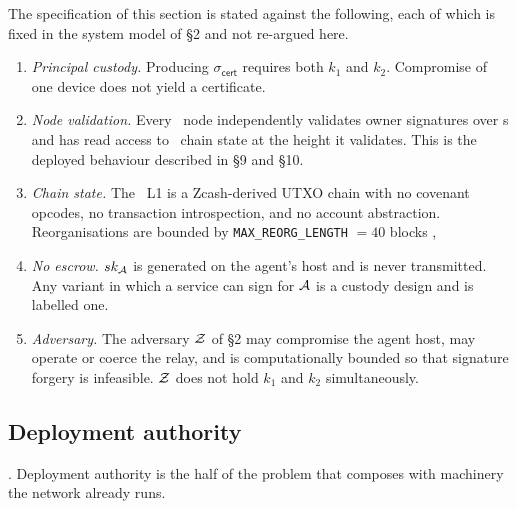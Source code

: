 \begin{assumption}
\label{ass:agent}
The specification of this section is stated against the following, each of which is fixed in the
system model of \S2 and not re-argued here.
\begin{enumerate}
  \item[(A1)] \emph{Principal custody.} Producing $\sigma_{\mathsf{cert}}$ requires both $k_1$ and
  $k_2$. Compromise of one device does not yield a certificate.
  \item[(A2)] \emph{Node validation.} Every \FluxOS\ node independently validates owner signatures
  over \appspec s and has read access to \fluxd\ chain state at the height it validates. This is the
  deployed behaviour described in \S9 and \S10.
  \item[(A3)] \emph{Chain state.} The \Flux\ L1 is a Zcash-derived UTXO chain with no covenant
  opcodes, no transaction introspection, and no account abstraction. Reorganisations are bounded by
  \texttt{MAX\_REORG\_LENGTH} $=40$ blocks
  , 
  \item[(A4)] \emph{No escrow.} $sk_{\mathcal{A}}$ is generated on the agent's host and is never
  transmitted. Any variant in which a service can sign for $\mathcal{A}$ is a custody design and is
  labelled one.
  \item[(A5)] \emph{Adversary.} The adversary $\mathcal{Z}$ of \S2 may compromise the agent host, may
  operate or coerce the relay, and is computationally bounded so that signature forgery is
  infeasible. $\mathcal{Z}$ does not hold $k_1$ and $k_2$ simultaneously.
\end{enumerate}
\end{assumption}

\subsection{Deployment authority}
\label{sec:agent-identity:deploy}

\planned. Deployment authority is the half of the problem that composes with machinery the network
already runs.

